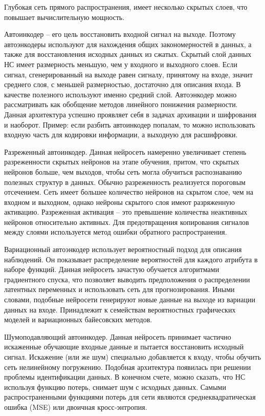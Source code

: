     Глубокая сеть прямого распространения, имеет несколько скрытых слоев, что повышает вычислительную мощность. 
    
    Автоинкодер – его цель восстановить входной сигнал на выходе. Поэтому автоэнкодеры используют для нахождения общих закономерностей в данных, а также для восстановления исходных данных из сжатых. Скрытый слой данных НС имеет размерность меньшую, чем у входного и выходного слоев. Если сигнал, сгенерированный на выходе равен сигналу, принятому на входе, значит среднего слоя, с меньшей размерностью, достаточно для описания входа. В качестве полезного используют именно средний слой. Автоэнкодер можно рассматривать как обобщение методов линейного понижения размерности. Данная архитектура успешно проявляет себя в задачах архивации и шифрования и наоборот. Пример: если разбить автоинкодер попалам, то можно использовать входную часть для кодировки информации, а выходную для расшифровки.
    
    Разреженный автоинкодер. Данная нейросеть намеренно увеличивает степень разреженности скрытых нейронов на этапе обучения, притом, что скрытых нейронов больше, чем выходов, чтобы сеть могла обучиться распознаванию полезных структур в данных. Обычно разреженность реализуется пороговым отсечением. Сеть имеет большее количество нейронов на скрытом слое, чем на входном и выходном, однако нейроны скрытого слоя имеют разряженную активацию. Разреженная активация – это превышение количества неактивных нейронов относительно активных. Для предотвращения копирования сигналов между слоями используется метод ошибки обратного распространения.
    
    Вариационный автоэнкодер использует вероятностный подход для описания наблюдений. Он показывает распределение вероятностей для каждого атрибута в наборе функций. Данная нейросеть зачастую обучается алгоритмами градиентного спуска, что позволяет выводить предположения о распределении латентных переменных и использовать сеть для прогнозирования. Иными словами, подобные нейросети генерируют новые данные на выходе из вариации данных на входе. Принадлежит к семействам вероятностных графических моделей и вариационных байесовских методов.
    
    Шумоподавляющий автоинкодер. Данная нейросеть принимает частично искаженные обучающие входные данные и пытается восстановить исходный сигнал. Искажение (или же шум) специально добавляется к входу, чтобы обучить сеть нелинейному погружению. Подобная архитектура появилась при решении проблемы идентификации данных. В конечном счете, можно сказать, что НС используя функцию потерь, снимает шум с исходных данных. Самыми распространенными функциями потерь для сети являются среднеквадратическая ошибка (MSE) или двоичная кросс‑энтропия.
    
